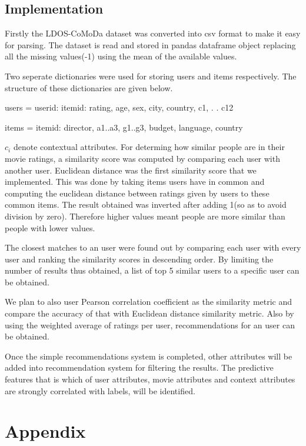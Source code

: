 \documentclass{article}
\begin{document}
\subsection{Implementation}

Firstly the LDOS-CoMoDa dataset was converted into csv format to make it easy for parsing. The dataset is read and stored in pandas dataframe object replacing all the missing values(-1) using the mean of the available values.

Two seperate dictionaries were used for storing users and items respectively. The structure of these dictionaries are given below.

users = 
	{userid: 
		{itemid:  
			rating, 
			age,
			sex,
			city,
			country, 
			c1,
			.
			.
			c12}}

items = 
	{itemid: 
		{director, 
		a1..a3,
		g1..g3, 
		budget, 
		language, 
		country}}
		
$c_{i}$ denote contextual attributes. For determing how similar people are in their movie ratings, a similarity score was computed by comparing each user with another user. Euclidean distance was the first similarity score that we implemented. This was done by taking items users have in common and computing the euclidean distance between ratings given by users to these common items. The result obtained was inverted after adding 1(so as to avoid division by zero). Therefore higher values meant people are more similar than people with lower values. 

The closest matches to an user were found out by comparing each user with every user and ranking the similarity scores in descending order. By limiting the number of results thus obtained, a list of top 5 similar users to a specific user can be obtained.

We plan to also user Pearson correlation coefficient as the similarity metric and compare the accuracy of that with Euclidean distance similarity metric. Also by using the weighted average of ratings per user,  recommendations for an user can be obtained. 

Once the simple recommendations system is completed, other attributes will be added into recommendation system for filtering the results. The predictive features that is which of user attributes, movie attributes and context attributes are strongly correlated with labels, will be identified. 

\pagebreak

\section{Appendix}
\end{document}
